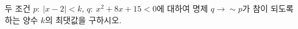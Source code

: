 두 조건 $p:\ |x-2|<k$, $q:\ x^2+8x+15<0$에 대하여 명제 $q\longrightarrow {\sim} p$가 참이 되도록 하는 양수 $k$의 최댓값을 구하시오.
